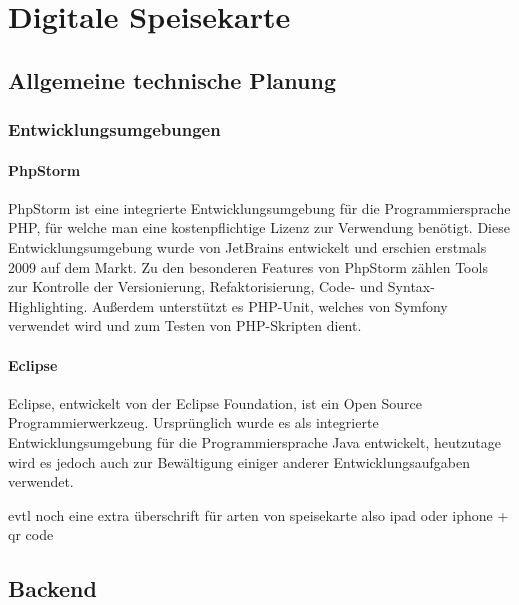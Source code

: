 \chapter{Digitale Speisekarte}
\renewcommand{\kapitelautor}{Autor: Katharina Joksch}

\section{Allgemeine technische Planung}

  \subsection{Entwicklungsumgebungen}

    \subsubsection{PhpStorm}

PhpStorm ist eine integrierte Entwicklungsumgebung für die Programmiersprache PHP, für welche man eine kostenpflichtige Lizenz zur Verwendung benötigt. Diese Entwicklungsumgebung wurde von JetBrains entwickelt und erschien erstmals 2009 auf dem Markt. Zu den besonderen Features von PhpStorm zählen Tools zur Kontrolle der Versionierung, Refaktorisierung, Code- und Syntax-Highlighting. Außerdem unterstützt es PHP-Unit, welches von Symfony verwendet wird und zum Testen von PHP-Skripten dient.

    \subsubsection{Eclipse}

Eclipse, entwickelt von der Eclipse Foundation, ist ein Open Source Programmierwerkzeug. Ursprünglich wurde es als integrierte Entwicklungsumgebung für die Programmiersprache Java entwickelt, heutzutage wird es jedoch auch zur Bewältigung einiger anderer Entwicklungsaufgaben verwendet.

evtl noch eine extra überschrift für arten von speisekarte also ipad oder iphone + qr code

\section{Backend}

